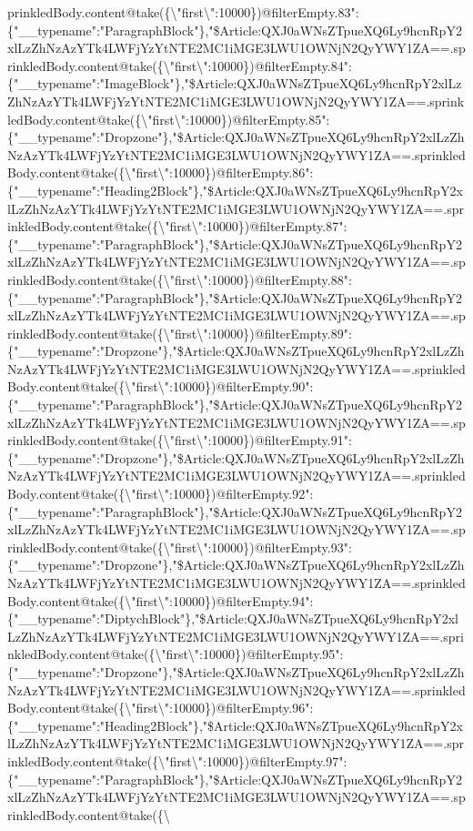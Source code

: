 prinkledBody.content@take(\{\textbackslash{}"first\textbackslash{}":10000\})@filterEmpty.83":\{"\_\_typename":"ParagraphBlock"\},"\$Article:QXJ0aWNsZTpueXQ6Ly9hcnRpY2xlLzZhNzAzYTk4LWFjYzYtNTE2MC1iMGE3LWU1OWNjN2QyYWY1ZA==.sprinkledBody.content@take(\{\textbackslash{}"first\textbackslash{}":10000\})@filterEmpty.84":\{"\_\_typename":"ImageBlock"\},"\$Article:QXJ0aWNsZTpueXQ6Ly9hcnRpY2xlLzZhNzAzYTk4LWFjYzYtNTE2MC1iMGE3LWU1OWNjN2QyYWY1ZA==.sprinkledBody.content@take(\{\textbackslash{}"first\textbackslash{}":10000\})@filterEmpty.85":\{"\_\_typename":"Dropzone"\},"\$Article:QXJ0aWNsZTpueXQ6Ly9hcnRpY2xlLzZhNzAzYTk4LWFjYzYtNTE2MC1iMGE3LWU1OWNjN2QyYWY1ZA==.sprinkledBody.content@take(\{\textbackslash{}"first\textbackslash{}":10000\})@filterEmpty.86":\{"\_\_typename":"Heading2Block"\},"\$Article:QXJ0aWNsZTpueXQ6Ly9hcnRpY2xlLzZhNzAzYTk4LWFjYzYtNTE2MC1iMGE3LWU1OWNjN2QyYWY1ZA==.sprinkledBody.content@take(\{\textbackslash{}"first\textbackslash{}":10000\})@filterEmpty.87":\{"\_\_typename":"ParagraphBlock"\},"\$Article:QXJ0aWNsZTpueXQ6Ly9hcnRpY2xlLzZhNzAzYTk4LWFjYzYtNTE2MC1iMGE3LWU1OWNjN2QyYWY1ZA==.sprinkledBody.content@take(\{\textbackslash{}"first\textbackslash{}":10000\})@filterEmpty.88":\{"\_\_typename":"ParagraphBlock"\},"\$Article:QXJ0aWNsZTpueXQ6Ly9hcnRpY2xlLzZhNzAzYTk4LWFjYzYtNTE2MC1iMGE3LWU1OWNjN2QyYWY1ZA==.sprinkledBody.content@take(\{\textbackslash{}"first\textbackslash{}":10000\})@filterEmpty.89":\{"\_\_typename":"Dropzone"\},"\$Article:QXJ0aWNsZTpueXQ6Ly9hcnRpY2xlLzZhNzAzYTk4LWFjYzYtNTE2MC1iMGE3LWU1OWNjN2QyYWY1ZA==.sprinkledBody.content@take(\{\textbackslash{}"first\textbackslash{}":10000\})@filterEmpty.90":\{"\_\_typename":"ParagraphBlock"\},"\$Article:QXJ0aWNsZTpueXQ6Ly9hcnRpY2xlLzZhNzAzYTk4LWFjYzYtNTE2MC1iMGE3LWU1OWNjN2QyYWY1ZA==.sprinkledBody.content@take(\{\textbackslash{}"first\textbackslash{}":10000\})@filterEmpty.91":\{"\_\_typename":"Dropzone"\},"\$Article:QXJ0aWNsZTpueXQ6Ly9hcnRpY2xlLzZhNzAzYTk4LWFjYzYtNTE2MC1iMGE3LWU1OWNjN2QyYWY1ZA==.sprinkledBody.content@take(\{\textbackslash{}"first\textbackslash{}":10000\})@filterEmpty.92":\{"\_\_typename":"ParagraphBlock"\},"\$Article:QXJ0aWNsZTpueXQ6Ly9hcnRpY2xlLzZhNzAzYTk4LWFjYzYtNTE2MC1iMGE3LWU1OWNjN2QyYWY1ZA==.sprinkledBody.content@take(\{\textbackslash{}"first\textbackslash{}":10000\})@filterEmpty.93":\{"\_\_typename":"Dropzone"\},"\$Article:QXJ0aWNsZTpueXQ6Ly9hcnRpY2xlLzZhNzAzYTk4LWFjYzYtNTE2MC1iMGE3LWU1OWNjN2QyYWY1ZA==.sprinkledBody.content@take(\{\textbackslash{}"first\textbackslash{}":10000\})@filterEmpty.94":\{"\_\_typename":"DiptychBlock"\},"\$Article:QXJ0aWNsZTpueXQ6Ly9hcnRpY2xlLzZhNzAzYTk4LWFjYzYtNTE2MC1iMGE3LWU1OWNjN2QyYWY1ZA==.sprinkledBody.content@take(\{\textbackslash{}"first\textbackslash{}":10000\})@filterEmpty.95":\{"\_\_typename":"Dropzone"\},"\$Article:QXJ0aWNsZTpueXQ6Ly9hcnRpY2xlLzZhNzAzYTk4LWFjYzYtNTE2MC1iMGE3LWU1OWNjN2QyYWY1ZA==.sprinkledBody.content@take(\{\textbackslash{}"first\textbackslash{}":10000\})@filterEmpty.96":\{"\_\_typename":"Heading2Block"\},"\$Article:QXJ0aWNsZTpueXQ6Ly9hcnRpY2xlLzZhNzAzYTk4LWFjYzYtNTE2MC1iMGE3LWU1OWNjN2QyYWY1ZA==.sprinkledBody.content@take(\{\textbackslash{}"first\textbackslash{}":10000\})@filterEmpty.97":\{"\_\_typename":"ParagraphBlock"\},"\$Article:QXJ0aWNsZTpueXQ6Ly9hcnRpY2xlLzZhNzAzYTk4LWFjYzYtNTE2MC1iMGE3LWU1OWNjN2QyYWY1ZA==.sprinkledBody.content@take(\{\textbackslash{}